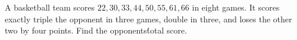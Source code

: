 A basketball team scores $22,30,33,44,50,55,61,66$ in eight games. It scores exactly triple the opponent in three games, double in three, and loses the other two by four points. Find the opponents\' total score.
